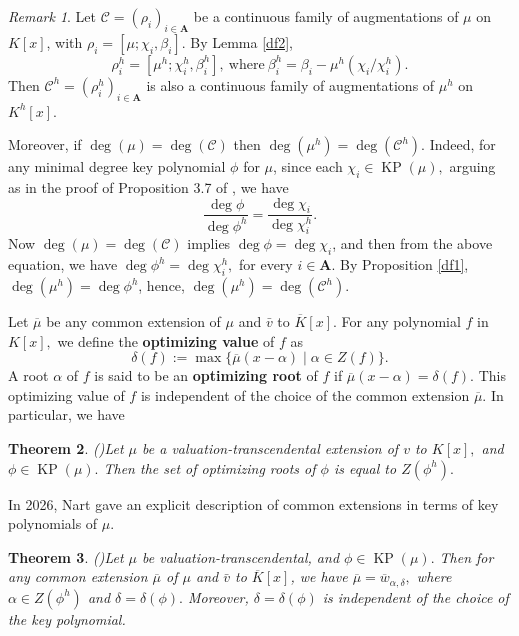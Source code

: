 \documentclass[11pt]{amsart}
\newtheorem{theorem}{Theorem}[section]
\theoremstyle{definition}
\theoremstyle{remark}
\newtheorem{remark}[theorem]{Remark}
\numberwithin{equation}{section}
\begin{document}
\begin{remark}\label{rem2}
	Let $\mathcal{C}=(\rho_i)_{i\in\mathbf{A}}$ be a continuous family of augmentations of $\mu$ on $K[x]$, with $\rho_i=[\mu; \chi_i,\beta_i]$. By Lemma \ref{df2}, \[\rho_i^h=[\mu^h;\chi_i^h,\beta_i^h],\ \text{where} \  \beta_i^h=\beta_i-\mu^h(\chi_i/\chi_i^h).\] Then $\mathcal{C}^h=(\rho_i^h)_{i\in\mathbf{A}}$ is also a continuous family of augmentations of $\mu^h$ on $K^h[x]$. 
	
	Moreover, if $\deg(\mu)=\deg(\mathcal{C})$ then $\deg(\mu^h)=\deg(\mathcal{C}^h).$ Indeed, for any minimal degree key polynomial $\phi$ for $\mu$, since each $\chi_i\in\operatorname{KP}(\mu),$ arguing as in the proof of Proposition 3.7 of \cite{NA}, we have  \[\frac{\deg\phi}{\deg\phi^h}=\frac{\deg\chi_i}{\deg\chi_i^h}.\] Now $\deg(\mu)=\deg(\mathcal{C})$ implies  $\deg\phi=\deg\chi_i$, and then from the above equation, we have $\deg\phi^h=\deg\chi_i^h,$ for every $i\in\mathbf{A}.$  By Proposition \ref{df1}, $\deg(\mu^h)=\deg\phi^h$, hence,  $\deg(\mu^h)=\deg(\mathcal{C}^h).$
\end{remark}


	Let $\overline{\mu}$ be any common extension of $\mu$ and $\bar{v}$ to $\overline{K}[x].$ For any polynomial $f$ in $K[x],$ we define the {\bf optimizing value} of $f$ as
$$\delta(f):=\max\{\overline{\mu}(x-\alpha)\mid \alpha\in Z(f)\}.$$ A root $\alpha$ of $f$ is said to be an {\bf optimizing root} of $f$ if $\overline{\mu}(x-\alpha)=\delta(f).$
This optimizing value of $f$ is independent of the choice of the common extension $\overline{\mu}.$ In particular, we have

  \begin{theorem}(\cite[Corollary 3.13]{EJP})\label{t21}
 	Let $\mu$ be a valuation-transcendental extension of $v$ to $K[x],$ and $\phi\in \operatorname{KP}(\mu).$ Then the set of optimizing roots of $\phi$ is equal to $Z(\phi^h).$
 \end{theorem}
 
 In 2026, Nart  gave an explicit description of common extensions in terms of key polynomials of $\mu.$
 \begin{theorem}(\cite[Remark 3.14]{EJP})\label{t2}
 	Let $\mu$ be valuation-transcendental, and $\phi\in\operatorname{KP}(\mu).$ Then for any common extension $\overline{\mu}$ of $\mu$ and $\bar{v}$ to $\overline{K}[x]$, we have $\overline{\mu}=\overline{w}_{\alpha,\delta},$ where $\alpha\in Z(\phi^h)$ and $\delta=\delta(\phi).$ Moreover, $\delta=\delta(\phi)$ is independent of the choice of the key polynomial.
\end{theorem}
\end{document}

